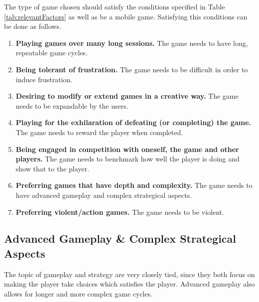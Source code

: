 The type of game chosen should satisfy the conditions specified in Table \ref{tab:relevantFactors} as well as be a mobile game.
Satisfying this conditions can be done as follows.
\begin{enumerate}
\item \textbf{Playing games over many long sessions.} The game needs to have long, repeatable game cycles.
\item \textbf{Being tolerant of frustration.} The game needs to be difficult in order to induce frustration.
\item \textbf{Desiring to modify or extend games in a creative way.} The game needs to be expandable by the users.
\item \textbf{Playing for the exhilaration of defeating (or completing) the game.} The game needs to reward the player when completed.
\item \textbf{Being engaged in competition with oneself, the game and other players.} The game needs to benchmark how well the player is doing and show that to the player.
\item \textbf{Preferring games that have depth and complexity.} The game needs to have advanced gameplay and complex strategical aspects.
\item \textbf{Preferring violent/action games.} The game needs to be violent.
\end{enumerate}

\subsection{Advanced Gameplay \& Complex Strategical Aspects}
The topic of gameplay and strategy are very closely tied, since they both focus on making the player take choices which satisfies the player.
Advanced gameplay also allows for longer and more complex game cycles.

